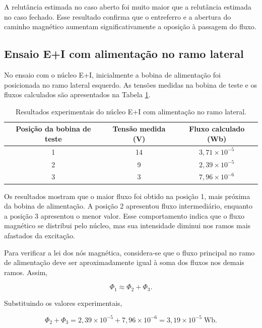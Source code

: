 \documentclass[11pt,a4paper]{article}
\begin{document}
A relutância estimada no caso aberto foi muito maior que a relutância estimada no caso fechado. Esse resultado confirma que o entreferro e a abertura do caminho magnético aumentam significativamente a oposição à passagem do fluxo.

\subsection{Ensaio E+I com alimentação no ramo lateral}

No ensaio com o núcleo E+I, inicialmente a bobina de alimentação foi posicionada no ramo lateral esquerdo. As tensões medidas na bobina de teste e os fluxos calculados são apresentados na Tabela \ref{tab:ei_lateral}.

\begin{table}[H] 
    \centering 
    \caption{Resultados experimentais do núcleo E+I com alimentação no ramo lateral.} \label{tab:ei_lateral} 
    \begin{tabular}{ccc} 
        \toprule Posição da bobina de teste & Tensão medida (V) & Fluxo calculado (Wb) \\ 
        \midrule 
        1 & 14 & \(3,71 \times 10^{-5}\) \\ 
        2 & 9 & \(2,39 \times 10^{-5}\) \\ 
        3 & 3 & \(7,96 \times 10^{-6}\) \\ 
        \bottomrule 
    \end{tabular} 
\end{table}

Os resultados mostram que o maior fluxo foi obtido na posição 1, mais próxima da bobina de alimentação. A posição 2 apresentou fluxo intermediário, enquanto a posição 3 apresentou o menor valor. Esse comportamento indica que o fluxo magnético se distribui pelo núcleo, mas sua intensidade diminui nos ramos mais afastados da excitação.

Para verificar a lei dos nós magnética, considera-se que o fluxo principal no ramo de alimentação deve ser aproximadamente igual à soma dos fluxos nos demais ramos. Assim,

\begin{equation} 
    \Phi_1 \approx \Phi_2 + \Phi_3 . 
    \label{eq:nos_lateral} 
\end{equation}

Substituindo os valores experimentais,

\begin{equation} 
    \Phi_2 + \Phi_3 = 
    2,39 \times 10^{-5} 
    + 
    7,96 \times 10^{-6} 
    = 
    3,19 \times 10^{-5} 
    \; \text{Wb}. 
    \label{eq:soma_lateral} 
\end{equation}
\end{document}
